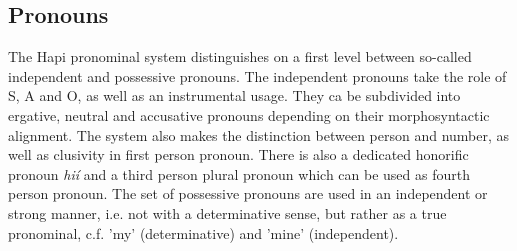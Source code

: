 \documentclass[a4paper, 12pt, oneside]{memoir}
\newcommand{\emh}[1]{\textit{#1}}
\begin{document}
\subsection{Pronouns}\label{spronouns}
The Hapi pronominal system distinguishes on a first level between so-called independent and possessive pronouns. The independent pronouns take the role of S, A and O, as well as an instrumental usage. They ca be subdivided into ergative, neutral and accusative pronouns depending on their morphosyntactic alignment. The system also makes the distinction between person and number, as well as clusivity in first person pronoun. There is also a dedicated honorific pronoun \emh{hií} and a third person plural pronoun which can be used as fourth person pronoun.
The set of possessive pronouns are used in an independent or strong manner, i.e. not with a determinative sense, but rather as a true pronominal, c.f. 'my' (determinative) and 'mine' (independent).
\end{document}
